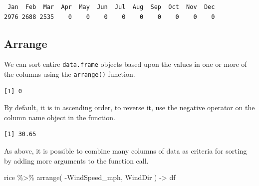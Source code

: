 \documentclass[
  letterpaper,
]{book}
\newenvironment{Shaded}{\begin{snugshade}}{\end{snugshade}}
\newcommand{\DecValTok}[1]{\textcolor[rgb]{0.68,0.00,0.00}{#1}}
\newcommand{\FunctionTok}[1]{\textcolor[rgb]{0.28,0.35,0.67}{#1}}
\newcommand{\NormalTok}[1]{\textcolor[rgb]{0.00,0.23,0.31}{#1}}
\newcommand{\OtherTok}[1]{\textcolor[rgb]{0.00,0.23,0.31}{#1}}
\newcommand{\SpecialCharTok}[1]{\textcolor[rgb]{0.37,0.37,0.37}{#1}}
\begin{document}
\begin{verbatim}
 Jan  Feb  Mar  Apr  May  Jun  Jul  Aug  Sep  Oct  Nov  Dec 
2976 2688 2535    0    0    0    0    0    0    0    0    0 
\end{verbatim}

\subsection{Arrange}\label{arrange}

We can sort entire \texttt{data.frame} objects based upon the values in
one or more of the columns using the \texttt{arrange()} function.

\begin{Shaded}
\end{Shaded}

\begin{verbatim}
[1] 0
\end{verbatim}

By default, it is in ascending order, to reverse it, use the negative
operator on the column name object in the function.

\begin{Shaded}
\end{Shaded}

\begin{verbatim}
[1] 30.65
\end{verbatim}

As above, it is possible to combine many columns of data as criteria for
sorting by adding more arguments to the function call.

\begin{Shaded}
\begin{Highlighting}[]
\NormalTok{rice }\SpecialCharTok{\%\textgreater{}\%}
  \FunctionTok{arrange}\NormalTok{( }\SpecialCharTok{{-}}\NormalTok{WindSpeed\_mph, WindDir ) }\OtherTok{{-}\textgreater{}}\NormalTok{ df}
\end{Highlighting}
\end{Shaded}
\end{document}
